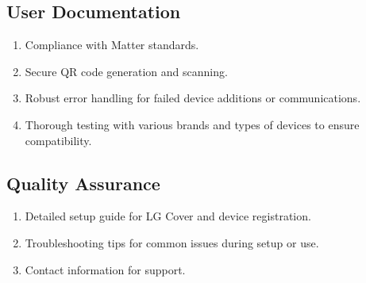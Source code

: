 \documentclass[conference]{IEEEtran}
\begin{document}
\subsection{\large{User Documentation}}
\begin{enumerate}[label=\arabic*.]
\item Compliance with Matter standards.\\
\item Secure QR code generation and scanning.\\
\item Robust error handling for failed device additions or communications.\\
\item Thorough testing with various brands and types of devices to ensure compatibility.\\
\end{enumerate}

\subsection{\large{Quality Assurance}}
\begin{enumerate}[label=\arabic*.]
\item Detailed setup guide for LG Cover and device registration.\\
\item Troubleshooting tips for common issues during setup or use.\\
\item Contact information for support.\\
\end{enumerate}
\end{document}
